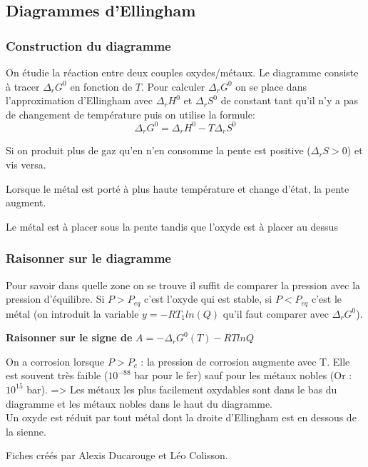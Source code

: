 \documentclass[9pt]{article}
\begin{document}
\begin{multicols*}{2}
\setlength{\columnseprule}{0.1pt}
\part*{Diagrammes d'Ellingham}
\section{Construction du diagramme}
On étudie la réaction entre deux couples oxydes/métaux. Le diagramme consiste à tracer $\Delta_rG^0$ en fonction de $T$. Pour calculer $\Delta_rG^0$ on se place dans l'approximation d'Ellingham avec $\Delta_rH^0$ et $\Delta_rS^0$ de constant tant qu'il n'y a pas de changement de température puis on utilise la formule:
$$\Delta_rG^0 = \Delta_rH^0 - T\Delta_rS^0$$

Si on produit plus de gaz qu'en n'en consomme la pente est positive ($\Delta_rS > 0$) et vis versa.

Lorsque le métal est porté à plus haute température et change d'état, la pente augment.

Le métal est à placer sous la pente tandis que l'oxyde est à placer au dessus

\section{Raisonner sur le diagramme}
Pour savoir dans quelle zone on se trouve il suffit de comparer la pression avec la pression d'équilibre. Si $P > P_{eq}$ c'est l'oxyde qui est stable, si $P < P_{eq}$ c'est le métal (on introduit la variable $y = -RT_1ln(Q)$ qu'il faut comparer avec $\Delta_rG^0$).
\medbreak

\textbf{Raisonner sur le signe de} $\boxed{A=-\Delta_rG^0(T)-RT ln Q}$

\medbreak
On a corrosion lorsque $P > P_c$ : la pression de corrosion augmente avec T. Elle est souvent très faible ($10^{-88}$ bar pour le fer) sauf pour les métaux nobles (Or : $10^{15}$ bar). => Les métaux les plus facilement oxydables sont dans le bas du diagramme et les métaux nobles dans le haut du diagramme.
\\


Un oxyde est réduit par tout métal dont la droite d'Ellingham est en dessous de la sienne.

\vfill\null
\footnotesize{Fiches créés par Alexis Ducarouge et Léo Colisson.}

\end{multicols*}
\end{document}
